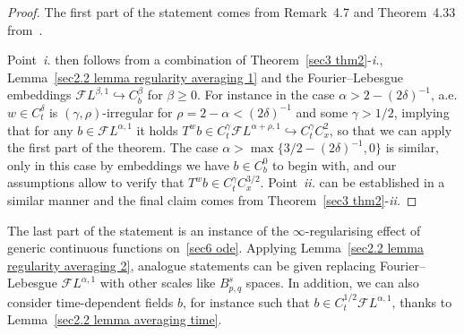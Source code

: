\documentclass[10pt]{article}
\newcommand{\tmtextit}[1]{{\itshape{#1}}}
\begin{document}
\begin{proof}
  The first part of the statement comes from Remark~4.7 and Theorem~4.33
  from~{\cite{galeatigubinelli_ode}}.
  
  Point~\tmtextit{i.} then follows from a combination of Theorem~\ref{sec3
  thm2}\mbox{-}\tmtextit{i.}, Lemma~\ref{sec2.2 lemma regularity averaging 1}
  and the Fourier--Lebesgue embeddings $\mathcal{F} L^{\beta, 1}
  \hookrightarrow C^{\beta}_b$ for $\beta \geqslant 0$. For instance in the
  case $\alpha > 2 - (2 \delta)^{- 1}$, a.e. $w \in C^{\delta}_t$ is $(\gamma,
  \rho)$-irregular for $\rho = 2 - \alpha < (2 \delta)^{- 1}$ and some $\gamma
  > 1 / 2$, implying that for any $b \in \mathcal{F} L^{\alpha, 1}$ it holds
  $T^w b \in C^{\gamma}_t \mathcal{F} L^{\alpha + \rho,1} \hookrightarrow
  C^{\gamma}_t C^2_x$, so that we can apply the first part of the theorem. The
  case $\alpha > \max \{ 3 / 2 - (2 \delta)^{- 1}, 0 \}$ is similar, only in
  this case by embeddings we have $b \in C^0_b$ to begin with, and our
  assumptions allow to verify that $T^w b \in C^{\gamma}_t C^{3 / 2}_x$.
  Point~\tmtextit{ii.} can be established in a similar manner and the final
  claim comes from Theorem~\ref{sec3 thm2}\mbox{-}\tmtextit{ii.}
\end{proof}

The last part of the statement is an instance of the
$\infty$\mbox{-}regularising effect of generic continuous functions
on~\eqref{sec6 ode}. Applying Lemma~\ref{sec2.2 lemma regularity averaging 2},
analogue statements can be given replacing Fourier--Lebesgue $\mathcal{F}
L^{\alpha, 1}$ with other scales like $B^s_{p, q}$ spaces. In addition, we can
also consider time\mbox{-}dependent fields $b$, for instance such that $b \in
C^{1 / 2}_t \mathcal{F} L^{\alpha, 1}$, thanks to Lemma~\ref{sec2.2 lemma
averaging time}.

\
\end{document}

